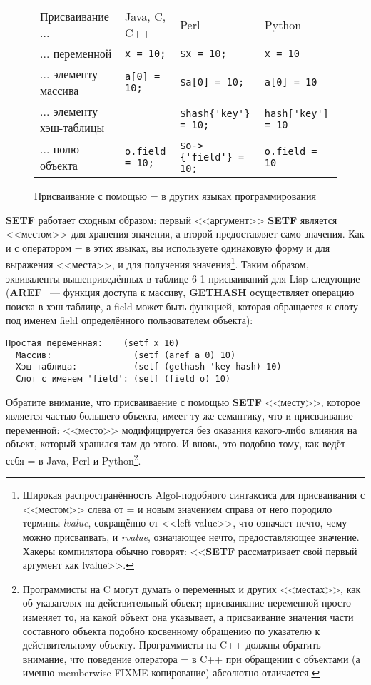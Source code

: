 \begin{figure}[tb]
\begin{tabular}{|>{\centering}m{40mm}|>{\centering}m{25mm}|>{\centering}m{30mm}|>{\centering}m{25mm}|}
Присваивание ...         & Java, C, C++        & Perl                & Python \\
... переменной           & \lstinline!x = 10;! & \lstinline!$x = 10;! & \lstinline!x = 10! \\
... элементу массива     & \lstinline!a[0] = 10;! & \lstinline!$a[0] = 10;! & \lstinline!a[0] = 10! \\
... элементу хэш-таблицы & --                  & \lstinline!$hash{'key'} = 10;!  & \lstinline!hash['key'] = 10! \\
... полю объекта         & \lstinline!o.field = 10;! & \lstinline!$o->{'field'} = 10;! & \lstinline!o.field = 10! 
\end{tabular}
  \caption{Присваивание с помощью = в других языках программирования} 
  \label{table:06-1}
\end{figure}


\textbf{SETF} работает сходным образом: первый <<аргумент>> \textbf{SETF}
является <<местом>> для хранения значения, а второй предоставляет само значения. Как и с оператором = в этих
языках, вы используете одинаковую форму и для выражения <<места>>, и для получения
значения\footnote{Широкая распространённость Algol-подобного синтаксиса для присваивания с
  <<местом>> слева от = и новым значением справа от него породило термины \textit{lvalue},
  сокращённо от <<left value>>, что означает нечто, чему можно присваивать, и
  \textit{rvalue}, означающее нечто, предоставляющее значение. Хакеры компилятора обычно
  говорят: <<\textbf{SETF} рассматривает свой первый аргумент как lvalue>>.}. Таким образом,
эквиваленты вышеприведённых в таблице 6-1 присваиваний для Lisp следующие (\textbf{AREF}
~--- функция доступа к массиву, \textbf{GETHASH} осуществляет операцию поиска в
хэш-таблице, а field может быть функцией, которая обращается к слоту под именем field
определённого пользователем объекта):

\begin{lstlisting}[style=lisprepl]
  Простая переменная:    (setf x 10) 
  Массив:                (setf (aref a 0) 10)
  Хэш-таблица:           (setf (gethash 'key hash) 10)
  Слот с именем 'field': (setf (field o) 10)
\end{lstlisting}

Обратите внимание, что присваиваение с помощью \textbf{SETF} <<месту>>, которое является
частью большего объекта, имеет ту же семантику, что и присваивание переменной: <<место>>
модифицируется без оказания какого-либо влияния на объект, который хранился там до
этого. И вновь, это подобно тому, как ведёт себя = в Java, Perl и
Python\footnote{Программисты на C могут думать о переменных и других <<местах>>, как об
  указателях на действительный объект; присваивание переменной просто изменяет
  то, на какой объект она указывает, а присваивание значения части составного объекта
  подобно косвенному обращению по указателю к действительному объекту. Программисты на C++
  должны обратить внимание, что поведение оператора = в C++ при обращении с объектами (а
  именно memberwise FIXME копирование) абсолютно отличается.}.

